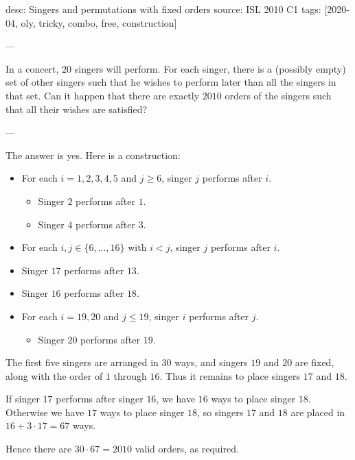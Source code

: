 desc: Singers and permutations with fixed orders
source: ISL 2010 C1
tags: [2020-04, oly, tricky, combo, free, construction]

---

In a concert, $20$ singers will perform. For each singer, there is a (possibly empty) set of other singers such that he wishes to perform later than all the singers in that set. Can it happen that there are exactly $2010$ orders of the singers such that all their wishes are satisfied?

---

The answer is yes. Here is a construction:
\begin{itemize}[itemsep=0em]
    \item For each $i=1,2,3,4,5$ and $j\ge6$, singer $j$ performs after $i$.
        \begin{itemize}[itemsep=0em]
            \item Singer $2$ performs after $1$.
            \item Singer $4$ performs after $3$.
        \end{itemize}
    \item For each $i,j\in\{6,\ldots,16\}$ with $i<j$, singer $j$ performs after $i$.
    \item Singer $17$ performs after $13$.
    \item Singer $16$ performs after $18$.
    \item For each $i=19,20$ and $j\le19$, singer $i$ performs after $j$.
        \begin{itemize}
            \item Singer $20$ performs after $19$.
        \end{itemize}
\end{itemize}
The first five singers are arranged in $30$ ways, and singers $19$ and $20$ are fixed, along with the order of $1$ through $16$. Thus it remains to place singers $17$ and $18$.

If singer $17$ performs after singer $16$, we have $16$ ways to place singer $18$. Otherwise we have $17$ ways to place singer $18$, so singers $17$ and $18$ are placed in $16+3\cdot17=67$ ways.

Hence there are $30\cdot67=2010$ valid orders, as required.
